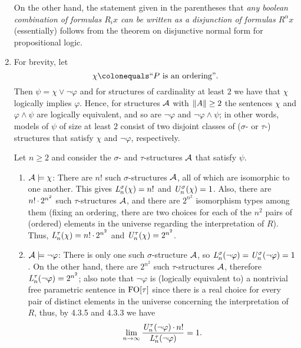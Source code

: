 \begin{enumerate}[1.]
On the other hand, the statement given in the parentheses that \emph{any boolean combination of formulas $R_i x$ can be written as a disjunction of formulas $R^\alpha x$} (essentially) follows from the theorem on disjunctive normal form for propositional logic.
%
\item {} For brevity, let
\[
\chi \defas \text{``\mathmode{P} is an ordering''}.
\]
Then $\psi = \chi \lor \neg\varphi$ and for structures of cardinality at least $2$ we have that $\chi$ logically implies $\varphi$. Hence, for structures $\mathcal{A}$ with $\|A\| \geq 2$ the sentences $\chi$ and $\varphi \land \psi$ are logically equivalent, and so are $\neg\varphi$ and $\neg\varphi \land \psi$; in other words, models of $\psi$ of size at least $2$ consist of two disjoint classes of ($\sigma$- or $\tau$-) structures that satisfy $\chi$ and $\neg\varphi$, respectively.

Let $n \geq 2$ and consider the $\sigma$- and $\tau$-structures $\mathcal{A}$ that satisfy $\psi$.
\begin{enumerate}[(1)]
\item $\mathcal{A} \models \chi$: There are $n!$ such $\sigma$-structures $\mathcal{A}$, all of which are isomorphic to one another. This gives $\mathit{L}_{n}^\sigma(\chi) = n!$ and $\mathit{U}_{n}^\sigma(\chi) = 1$. Also, there are $n! \mathop{\cdot} 2^{n^2}$ such $\tau$-structures $\mathcal{A}$, and there are $2^{n^2}$ isomorphism types among them (fixing an ordering, there are two choices for each of the $n^2$ pairs of (ordered) elements in the universe regarding the interpretation of $R$). Thus, $\mathit{L}_{n}^\tau(\chi) = n! \mathop{\cdot} 2^{n^2}$ and $\mathit{U}_{n}^\tau(\chi) = 2^{n^2}$.
\item $\mathcal{A} \models \neg\varphi$: There is only one such $\sigma$-structure $\mathcal{A}$, so $\mathit{L}_{n}^\sigma(\neg\varphi) = \mathit{U}_{n}^\sigma(\neg\varphi) = 1$. On the other hand, there are $2^{n^2}$ such $\tau$-structures $\mathcal{A}$, therefore $\mathit{L}_{n}^\tau(\neg\varphi) = 2^{n^2}$; also note that $\neg\varphi$ is (logically equivalent to) a nontrivial free parametric sentence in $\folog\of{\tau}$ since there is a real choice for every pair of distinct elements in the universe concerning the interpretation of $R$, thus, by 4.3.5 and 4.3.3 we have
\[
\lim_{n \to \infty} \frac{\mathit{U}_{n}^\tau(\neg\varphi) \mathop{\cdot} n!}{\mathit{L}_{n}^\tau(\neg\varphi)} = 1.
\]


\end{enumerate}
\end{enumerate}
